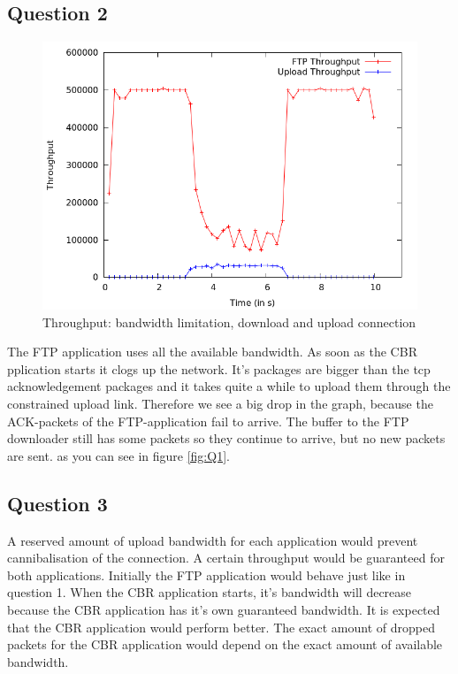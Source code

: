 \documentclass[11pt,a4paper]{article}
\begin{document}
\subsection{Question 2}
\begin{figure}[h!]
 \centering
 \includegraphics[width = 0.8\linewidth]{./output-ex1-part-2-1-7.png}
  \caption{Throughput: bandwidth limitation, download and upload connection}
 \label{fig:Q2}
\end{figure}
The FTP application uses all the available bandwidth. As soon as the CBR pplication starts it clogs up the network. It's packages are bigger than the tcp acknowledgement packages and it takes quite a while to upload them through the constrained upload link. Therefore we see a big drop in the graph, because the ACK-packets of the FTP-application fail to arrive. The buffer to the FTP downloader still has some packets so they continue to arrive, but no new packets are sent.
as you can see in figure \ref{fig:Q1}.

\subsection{Question 3}
A reserved amount of upload bandwidth for each application would prevent cannibalisation of the connection. A certain throughput would be guaranteed for both applications. Initially the FTP application would behave just like in question 1. When the CBR application starts, it's bandwidth will decrease because the CBR application has it's own guaranteed bandwidth. It is expected that the CBR application would perform better. The exact amount of dropped packets for the CBR application would depend on the exact amount of available bandwidth.
\end{document}
